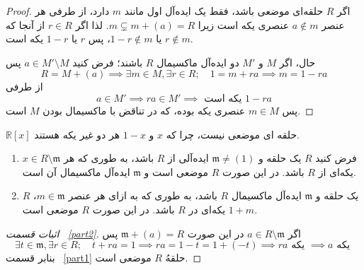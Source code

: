 \begin{proof}
    اگر
    \(R\)
    حلقه‌ای
    موضعی باشد،‌ فقط یک ایده‌آل اول مانند
    \(m\)
    دارد، از طرفی هر عنصر
    \(a \notin m\)
    عنصری یکه است زیرا
    \(m \subsetneq m + (a) = R\).
    لذا اگر
    \(r \in R\)
    از آنجا که
    \(r \notin m\)
    یا
    \(1-r \notin m\)، پس
    \(r \)
    یا
    \(1-r \)
    یکه است.

    حال، اگر
    \(M\)
    و
    \(M'\)
    دو ایده‌آل ماکسیمال
    \(R\)
    باشند؛ فرض کنید
    \(a \in M' \setminus M\)
    پس
    \[
        R = M + (a) \implies \exists m \in M, \exists r \in R; \quad 1 = m + ra \implies m = 1 - ra
    \]
    از طرفی
    \[
        a \in M' \implies ra \in M' \implies \text{ یکه است } 1 - ra
    \]
    پس
    \(m \in M\)
    عنصری یکه بوده، که در تناقض با ماکسیمال بودن
    \(M\)
    است.
\end{proof}


\begin{corollary}
    \(\mathbb{R}[x]\)
    حلقه ای موضعی نیست،‌ چرا که
    \(x\)
    و
    \(1-x\)
    هر دو غیر یکه هستند.
\end{corollary}

\begin{corollary}
    \begin{enumerate}
        \item فرض کنید
              \(R\)
              یک حلقه و
              \(\mathfrak{m}  \neq (1)\)
              ایده‌آلی از
              \(R\)
              باشد، به طوری که هر
              \(x \in R \setminus \mathfrak{m}\)
              یکه‌ای از
              \(R\)
              باشد. در این صورت
              \(R\)
              موضعی است و
              \(\mathfrak{m}\)
              ایده‌آل ماکسیمال آن است.
              \label{part1}
        \item \(R\)
              یک حلقه و
              \(\mathfrak{m}\)
              ایده‌آل ماکسیمال
              \(R\)
              باشد، به طوری که به ازای هر عنصر
              \(m \in \mathfrak{m}\)،
              \(1+m\)
              یکه‌ای در
              \(R\)
              باشد. در این صورت
              \(R\)
              موضعی است.
              \label{part2}
    \end{enumerate}
\end{corollary}


\begin{proof}[اثبات قسمت ~\ref{part2}]
    اگر
    \(a \in R \setminus \mathfrak{m}\)
    در این صورت
    \(\mathfrak{m} + (a) = R\)
    پس
    \[
        \exists t \in \mathfrak{m}, \exists r \in R; \quad t + ra = 1 \implies ra = 1 - t = 1 + (-t) \implies ra \text{ یکه } \implies a \text{ یکه }
    \]
    بنابر
    قسمت
    ~\ref{part1}
    حلقهُ
    \(R\)
    موضعی است.
\end{proof}


